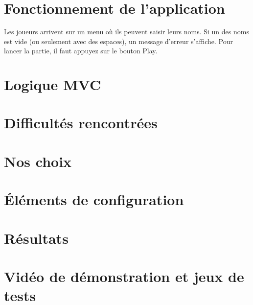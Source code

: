\section{Fonctionnement de l'application}

Les joueurs arrivent sur un menu où ils peuvent saisir leurs noms. Si un des
noms est vide (ou seulement avec des espaces), un message d'erreur s'affiche.
Pour lancer la partie, il faut appuyez sur le bouton Play.

\section{Logique MVC}


\section{Difficultés rencontrées} 

\section{Nos choix}

\section{Éléments de configuration}

\section{Résultats}

\section{Vidéo de démonstration et jeux de tests}
